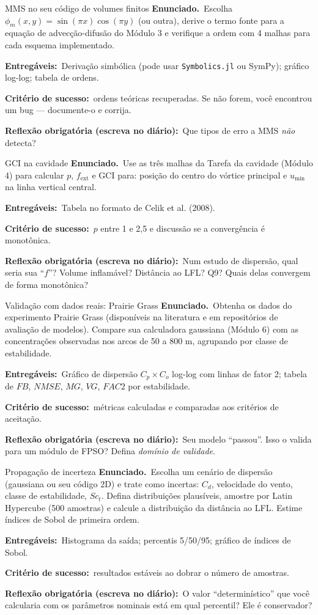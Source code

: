 \documentclass[10pt,a4paper,twocolumn,openany]{report}
\newcommand{\enunciado}{\noindent\textbf{Enunciado.}\ }
\newcommand{\entregaveis}{\par\medskip\noindent\textbf{Entregáveis:}}
\newcommand{\criterio}{\par\medskip\noindent\textbf{Critério de sucesso:}\ }
\newcommand{\reflexao}{\par\medskip\noindent\textbf{Reflexão obrigatória (escreva no diário):}}
\begin{document}
\begin{tarefa}{MMS no seu código de volumes finitos}
\enunciado Escolha $\phi_m(x,y)=\sin(\pi x)\cos(\pi y)$ (ou outra), derive o
termo fonte para a equação de advecção-difusão do Módulo 3 e verifique a
ordem com 4 malhas para cada esquema implementado.
\entregaveis\ Derivação simbólica (pode usar \texttt{Symbolics.jl} ou SymPy);
gráfico log-log; tabela de ordens.
\criterio ordens teóricas recuperadas. Se não forem, você encontrou um bug
--- documente-o e corrija.
\reflexao\ Que tipos de erro a MMS \emph{não} detecta?
\end{tarefa}

\begin{tarefa}{GCI na cavidade}
\enunciado Use as três malhas da Tarefa da cavidade (Módulo 4) para calcular
$p$, $f_{\text{ext}}$ e GCI para: posição do centro do vórtice principal e
$u_{\min}$ na linha vertical central.
\entregaveis\ Tabela no formato de Celik et al. (2008).
\criterio $p$ entre 1 e 2,5 e discussão se a convergência é monotônica.
\reflexao\ Num estudo de dispersão, qual seria sua ``$f$''? Volume
inflamável? Distância ao LFL? Q9? Quais delas convergem de forma monotônica?
\end{tarefa}

\begin{tarefa}{Validação com dados reais: Prairie Grass}
\enunciado Obtenha os dados do experimento Prairie Grass (disponíveis na
literatura e em repositórios de avaliação de modelos). Compare sua
calculadora gaussiana (Módulo 6) com as concentrações observadas nos arcos
de 50 a 800 m, agrupando por classe de estabilidade.
\entregaveis\ Gráfico de dispersão $C_p\times C_o$ log-log com linhas de
fator 2; tabela de $FB$, $NMSE$, $MG$, $VG$, $FAC2$ por estabilidade.
\criterio métricas calculadas e comparadas aos critérios de aceitação.
\reflexao\ Seu modelo ``passou''. Isso o valida para um módulo de FPSO? Defina
\emph{domínio de validade}.
\end{tarefa}

\begin{tarefa}{Propagação de incerteza}
\enunciado Escolha um cenário de dispersão (gaussiana ou seu código 2D) e
trate como incertas: $C_d$, velocidade do vento, classe de estabilidade,
$Sc_t$. Defina distribuições plausíveis, amostre por Latin Hypercube (500
amostras) e calcule a distribuição da distância ao LFL. Estime índices de
Sobol de primeira ordem.
\entregaveis\ Histograma da saída; percentis 5/50/95; gráfico de índices de
Sobol.
\criterio resultados estáveis ao dobrar o número de amostras.
\reflexao\ O valor ``determinístico'' que você calcularia com os parâmetros
nominais está em qual percentil? Ele é conservador?
\end{tarefa}
\end{document}
